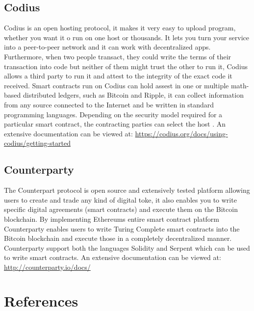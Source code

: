 \documentclass[12pt]{article}
\begin{document}
\subsection{Codius}
Codius is an open hosting protocol, it makes it very easy to upload program, whether you want it o run on one host or thousands. It lets you turn your service into a peer-to-peer network and it can work with decentralized apps. Furthermore, when two people transact, they could write the terms of their transaction into code but neither of them might trust the other to run it, Codius allows a third party to run it and attest to the integrity of the exact code it received. 
\newline
\newline
Smart contracts run on Codius can hold assest in one or multiple math-based distributed ledgers, such as Bitcoin and Ripple, it can collect information from any source connected to the Internet and be written in standard programming languages. Depending on the security model required for a particular smart contract, the contracting parties can select the host . An extensive documentation can be viewed at: \url{https://codius.org/docs/using-codius/getting-started}

\subsection{Counterparty}
The Counterpart protocol is open source and extensively tested platform allowing users to create and trade any kind of digital toke, it also enables you to write specific digital agreements (smart contracts) and execute them on the Bitcoin blockchain. 
\newline
\newline
By implementing Ethereums entire smart contract platform Counterparty enables users to write Turing Complete smart contracts into the Bitcoin blockchain and execute those in a completely decentralized manner. Counterparty support both the languages Solidity and Serpent which can be used to write smart contracts. An extensive documentation can be viewed at: \url{http://counterparty.io/docs/}



\newpage
\section*{References}
\end{document}

